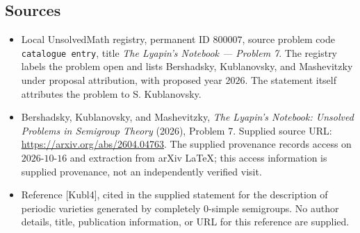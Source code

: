 \documentclass[11pt]{article}
\begin{document}
\subsection{Sources}
\begin{itemize}
\item Local UnsolvedMath registry, permanent ID \(800007\), source problem code \texttt{catalogue entry}, title \emph{The Lyapin's Notebook --- Problem 7}. The registry labels the problem open and lists Bershadsky, Kublanovsky, and Mashevitzky under proposal attribution, with proposed year \(2026\). The statement itself attributes the problem to S. Kublanovsky.
\item Bershadsky, Kublanovsky, and Mashevitzky, \emph{The Lyapin's Notebook: Unsolved Problems in Semigroup Theory} (2026), Problem 7. Supplied source URL: \url{https://arxiv.org/abs/2604.04763}. The supplied provenance records access on \(2026\text{-}10\text{-}16\) and extraction from arXiv LaTeX; this access information is supplied provenance, not an independently verified visit.
\item Reference [Kubl4], cited in the supplied statement for the description of periodic varieties generated by completely \(0\)-simple semigroups. No author details, title, publication information, or URL for this reference are supplied.
\end{itemize}
\end{document}
